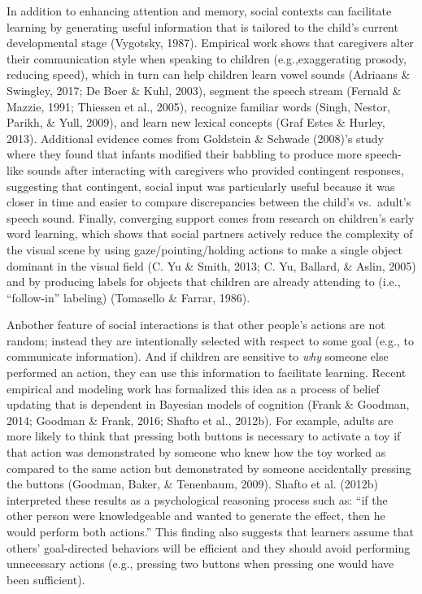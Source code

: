 \documentclass[oneside]{report}
\begin{document}
In addition to enhancing attention and memory, social contexts can
facilitate learning by generating useful information that is tailored to
the child's current developmental stage (Vygotsky, 1987). Empirical work
shows that caregivers alter their communication style when speaking to
children (e.g.,exaggerating prosody, reducing speed), which in turn can
help children learn vowel sounds (Adriaans \& Swingley, 2017; De Boer \&
Kuhl, 2003), segment the speech stream (Fernald \& Mazzie, 1991;
Thiessen et al., 2005), recognize familiar words (Singh, Nestor, Parikh,
\& Yull, 2009), and learn new lexical concepts (Graf Estes \& Hurley,
2013). Additional evidence comes from Goldstein \& Schwade (2008)'s
study where they found that infants modified their babbling to produce
more speech-like sounds after interacting with caregivers who provided
contingent responses, suggesting that contingent, social input was
particularly useful because it was closer in time and easier to compare
discrepancies between the child's vs.~adult's speech sound. Finally,
converging support comes from research on children's early word
learning, which shows that social partners actively reduce the
complexity of the visual scene by using gaze/pointing/holding actions to
make a single object dominant in the visual field (C. Yu \& Smith, 2013;
C. Yu, Ballard, \& Aslin, 2005) and by producing labels for objects that
children are already attending to (i.e., ``follow-in'' labeling)
(Tomasello \& Farrar, 1986).

Anbother feature of social interactions is that other people's actions
are not random; instead they are intentionally selected with respect to
some goal (e.g., to communicate information). And if children are
sensitive to \emph{why} someone else performed an action, they can use
this information to facilitate learning. Recent empirical and modeling
work has formalized this idea as a process of belief updating that is
dependent in Bayesian models of cognition (Frank \& Goodman, 2014;
Goodman \& Frank, 2016; Shafto et al., 2012b). For example, adults are
more likely to think that pressing both buttons is necessary to activate
a toy if that action was demonstrated by someone who knew how the toy
worked as compared to the same action but demonstrated by someone
accidentally pressing the buttons (Goodman, Baker, \& Tenenbaum, 2009).
Shafto et al. (2012b) interpreted these results as a psychological
reasoning process such as: ``if the other person were knowledgeable and
wanted to generate the effect, then he would perform both actions.''
This finding also suggests that learners assume that others'
goal-directed behaviors will be efficient and they should avoid
performing unnecessary actions (e.g., pressing two buttons when pressing
one would have been sufficient).
\end{document}
